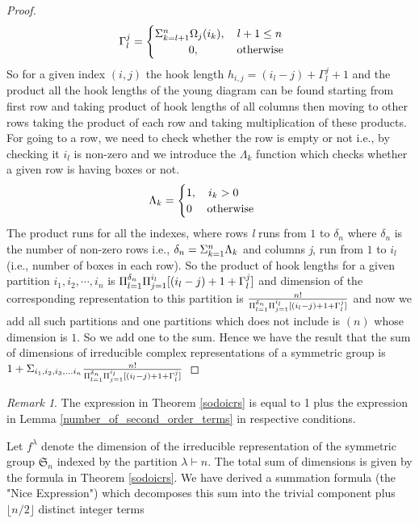 \documentclass[oneside]{amsart}
\theoremstyle{plain}
\theoremstyle{definition}
\theoremstyle{remark}
\newtheorem{remark}[theorem]{Remark} %
\begin{document}
\begin{proof}
        \begin{align*}
            {\Large\Gamma}_l^j = \begin{cases}
                    \Sigma_{k = l + 1}^{n}{\Large\Omega}_j(i_k),  \quad  l + 1 \leq n\\
                        \quad \quad \quad 0,  \quad\qquad \text{ otherwise }
            \end{cases}
        \end{align*}
        So for a given index $(i, j)$ the hook length $h_{i, j} = (i_l - j) + \Gamma_l^j + 1$ and the product all the hook lengths of the young diagram can be found starting from first row and taking product of hook lengths of all columns then moving to other rows taking the product of each row and taking multiplication of these products. For going to a row, we need to check whether the row is empty or not i.e., by checking it $i_l$ is non-zero and we introduce the ${\Lambda}_k$ function which checks whether a given row is having boxes or not.
        \begin{align*}
            {\Large\Lambda}_k = \begin{cases}
                    1,  \quad i_k > 0\\
                        0  \quad \text{ otherwise }
            \end{cases}
        \end{align*}
        The product runs for all the indexes, where rows \textit{l} runs from $1$ to ${\delta}_n$ where ${\delta}_n$ is the number of non-zero rows i.e., ${\Large\delta}_n = \Sigma_{k = 1}^n{\Large\Lambda}_k$ and columns \textit{j}, run from $1$ to $i_l$ (i.e., number of boxes in each row). So the product of hook lengths for a given partition $i_1, i_2, \cdots , i_n$ is $\Pi_{l = 1}^{{\delta}_n}\Pi_{j = 1}^{i_{l}} [(i_l - j) + 1 + {\Large\Gamma}_l^j]$ and dimension of the corresponding representation to this partition is $\frac{n!}{\Pi_{l = 1}^{{\delta}_n}\Pi_{j = 1}^{i_{l}} [(i_l - j) + 1 + {\Large\Gamma}_l^j]}$ and now we add all such partitions and one partitions which does not include is $(n)$ whose dimension is $1$. So we add one to the sum. Hence we have the result that the sum of dimensions of irreducible complex representations of a symmetric group is $1 + \Sigma_{i_1, i_2, i_3, \ldots i_n}\frac{n!}{\Pi_{l = 1}^{{\delta}_n}\Pi_{j = 1}^{i_{l}} [(i_l - j) + 1 + {\Large\Gamma}_l^j]}$
    \end{proof}
    \begin{remark}
        The expression in Theorem \ref{sodoicrs} is equal to 1 plus the expression in Lemma \ref{number_of_second_order_terms} in respective conditions.
    \end{remark}
    Let $f^\lambda$ denote the dimension of the irreducible representation of the symmetric group $\mathfrak{S}_n$ indexed by the partition $\lambda \vdash n$. The total sum of dimensions is given by the formula in Theorem \ref{sodoicrs}.
    We have derived a summation formula (the "Nice Expression") which decomposes this sum into the trivial component plus $\lfloor n/2 \rfloor$ distinct integer terms
    
\end{document}
